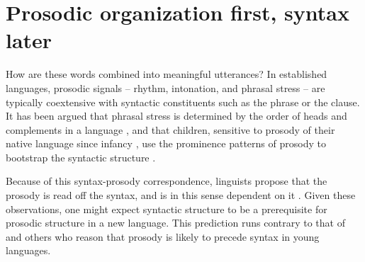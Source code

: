 \documentclass[output=paper]{langsci/langscibook}
\begin{document}
\section{Prosodic organization first, syntax later}

   How are these words combined into meaningful utterances?  In established languages, prosodic signals – rhythm, intonation, and phrasal stress -- are typically coextensive with syntactic constituents such as the phrase or the clause.  It has been argued that phrasal stress is determined by the order of heads and complements in a language \citep{Nespor1986}, and that children, sensitive to prosody of their native language since infancy \citep[e.g.,][]{Mehler1994,Juscyk1997}, use the prominence patterns of prosody to bootstrap the syntactic structure \citep[e.g.,][]{Nespor1996}.  

Because of this syntax-prosody correspondence, linguists propose that the prosody is read off the syntax, and is in this sense dependent on it \citep{Selkirk1984,Nespor1986}.  Given these observations, one might expect syntactic structure to be a prerequisite for prosodic structure in a new language.  This prediction runs contrary to that of \citet{Givón1979} and others who reason that prosody is likely to precede syntax in young languages.
\end{document}
